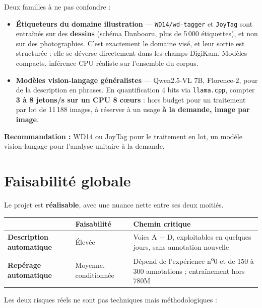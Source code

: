 \documentclass[11pt,a4paper]{article}
\newcommand{\aretenir}[1]{%
  \par\medskip
  \noindent\colorbox{encadre}{%
    \begin{minipage}{\dimexpr\linewidth-2\fboxsep}
      \vspace{2pt}#1\vspace{2pt}
    \end{minipage}}%
  \par\medskip
}
\begin{document}
Deux familles à ne pas confondre :

\begin{itemize}[leftmargin=*,itemsep=4pt]
  \item \textbf{Étiqueteurs du domaine illustration} — \texttt{WD14/wd-tagger} et
  \texttt{JoyTag} sont entraînés sur des \textbf{dessins} (schéma Danbooru, plus
  de 5\,000 étiquettes), et non sur des photographies. C'est exactement le domaine
  visé, et leur sortie est structurée : elle se déverse directement dans les
  champs DigiKam. Modèles compacts, inférence CPU réaliste sur l'ensemble du
  corpus.
  \item \textbf{Modèles vision-langage généralistes} — Qwen2.5-VL 7B,
  Florence-2, pour de la description en phrases. En quantification 4 bits via
  \texttt{llama.cpp}, compter \textbf{3 à 8 jetons/s sur un CPU 8 c\oe urs} : hors
  budget pour un traitement par lot de 11\,188 images, à réserver à un usage
  \textbf{à la demande, image par image}.
\end{itemize}

\aretenir{\textbf{Recommandation :} WD14 ou JoyTag pour le traitement en lot, un
modèle vision-langage pour l'analyse unitaire à la demande.}

\section{Faisabilité globale}

Le projet est \textbf{réalisable}, avec une nuance nette entre ses deux moitiés.

\begin{table}[h]
\centering
\small
\begin{tabularx}{\textwidth}{llY}
\toprule
 & \textbf{Faisabilité} & \textbf{Chemin critique} \\
\midrule
\textbf{Description automatique} & Élevée &
Voies A + D, exploitables en quelques jours, sans annotation nouvelle \\
\addlinespace
\textbf{Repérage automatique} & Moyenne, conditionnée &
Dépend de l'expérience n\textsuperscript{o}0 et de 150 à 300 annotations ;
entraînement hors 780M \\
\bottomrule
\end{tabularx}
\end{table}

Les deux risques réels ne sont pas techniques mais méthodologiques :
\end{document}
